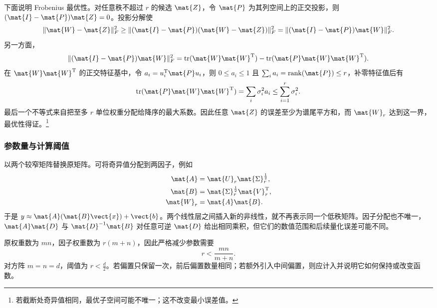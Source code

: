 \documentclass[../textbook.tex]{subfiles}
\begin{document}
下面说明 Frobenius 最优性。对任意秩不超过 $r$ 的候选 $\mat{Z}$，令 $\mat{P}$ 为其列空间上的正交投影，则 $(\mat{I}-\mat{P})\mat{Z}=0$。投影分解使
\begin{equation}
 \|\mat{W}-\mat{Z}\|_F^2\geq\|(\mat{I}-\mat{P})(\mat{W}-\mat{Z})\|_F^2
 =\|(\mat{I}-\mat{P})\mat{W}\|_F^2.
\end{equation}
另一方面，
\begin{equation}
 \|(\mat{I}-\mat{P})\mat{W}\|_F^2=\operatorname{tr}(\mat{W}\mat{W}^{\mathrm{T}})
 -\operatorname{tr}(\mat{P}\mat{W}\mat{W}^{\mathrm{T}}).
\end{equation}
在 $\mat{W}\mat{W}^{\mathrm{T}}$ 的正交特征基中，令 $a_i=u_i^{\mathrm{T}} \mat{P} u_i$，则 $0\leq a_i\leq1$ 且 $\sum_i a_i=\operatorname{rank}(\mat{P})\leq r$，补零特征值后有
\begin{equation}
 \operatorname{tr}(\mat{P}\mat{W}\mat{W}^{\mathrm{T}})=\sum_i\sigma_i^2a_i
 \leq\sum_{i=1}^r\sigma_i^2.
\end{equation}
最后一个不等式来自把至多 $r$ 单位权重分配给降序的最大系数。因此任意 $\mat{Z}$ 的误差至少为谱尾平方和，而 $\mat{W}_r$ 达到这一界，最优性得证。\footnote{若截断处奇异值相同，最优子空间可能不唯一；这不改变最小误差值。}

\subsubsection{参数量与计算阈值}
以两个较窄矩阵替换原矩阵。可将奇异值分配到两因子，例如
\begin{equation}
\begin{aligned}
 \mat{A} &= \mat{U}_r\mat{\Sigma}_r^{\frac{1}{2}}, \\
 \mat{B} &= \mat{\Sigma}_r^{\frac{1}{2}}\mat{V}_r^{\mathrm{T}}, \\
 \mat{W}_r &= \mat{A}\mat{B}.
\end{aligned}
\end{equation}
于是 $y\approx \mat{A}(\mat{B}\vect{x})+\vect{b}$。两个线性层之间插入新的非线性，就不再表示同一个低秩矩阵。因子分配也不唯一，$\mat{A}\mat{D}$ 与 $\mat{D}^{-1}\mat{B}$ 对任意可逆 $\mat{D}$ 给出相同乘积，但它们的数值范围和后续量化误差可能不同。

原权重数为 $mn$，因子权重数为 $r(m+n)$，因此严格减少参数需要
\begin{equation}
 r<\frac{mn}{m+n}.
 \label{eq:compress-rankthreshold}
\end{equation}
对方阵 $m=n=d$，阈值为 $r<\frac{d}{2}$。若偏置只保留一次，前后偏置数量相同；若额外引入中间偏置，则应计入并说明它如何保持或改变函数。
\end{document}
